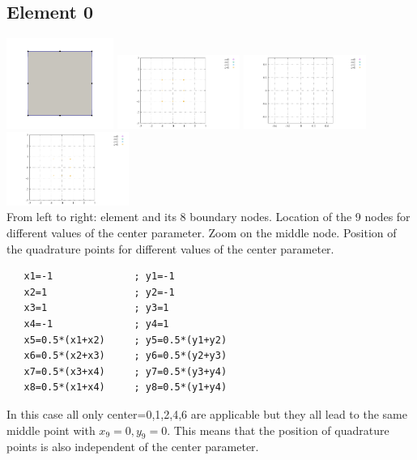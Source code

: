 \subsection*{Element 0}
\begin{center}
\includegraphics[width=3.5cm]{images/mappings/biquadratic3/elt0/element0}
\includegraphics[width=4cm]{images/mappings/biquadratic3/elt0/nodes}
\includegraphics[width=4cm]{images/mappings/biquadratic3/elt0/nodes_zoom}
\includegraphics[width=4cm]{images/mappings/biquadratic3/elt0/quad_points}\\
{\captionfont From left to right: element and its 8 boundary nodes.
Location of the 9 nodes for different values of the center parameter.
Zoom on the middle node. 
Position of the quadrature points for different values of the center parameter.}
\end{center}
\begin{lstlisting}
   x1=-1              ; y1=-1
   x2=1               ; y2=-1
   x3=1               ; y3=1
   x4=-1              ; y4=1
   x5=0.5*(x1+x2)     ; y5=0.5*(y1+y2)
   x6=0.5*(x2+x3)     ; y6=0.5*(y2+y3)
   x7=0.5*(x3+x4)     ; y7=0.5*(y3+y4)
   x8=0.5*(x1+x4)     ; y8=0.5*(y1+y4)
\end{lstlisting}

In this case all only {\python center=0,1,2,4,6} are applicable but they all 
lead to the same middle point with $x_9=0,y_9=0$. This means that the position of 
quadrature points is also independent of the {\python center} parameter.

